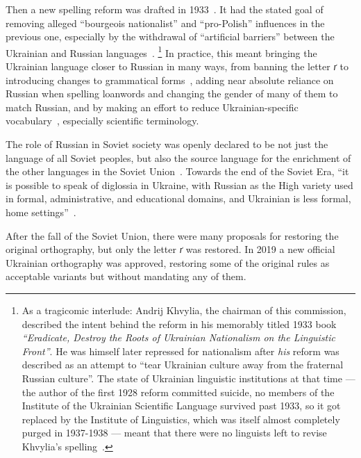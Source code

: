 Then a new \textquotesingle spelling\textquotesingle{} reform was drafted
in 1933~\cite{5c48fce9-c05d-3d4e-94c1-cd6079bff660}. It had the stated goal of
removing alleged ``bourgeois nationalist'' and ``pro-Polish'' influences in
the previous one, especially by the withdrawal of ``artificial barriers''
between the Ukrainian and Russian languages~\cite{karunyk2017ukrainian}.%
\footnote{As a tragicomic interlude: Andrij Khvylia, the chairman of this commission, described the intent behind the reform in his memorably titled 1933 book 
\textit{\enquote{Eradicate, Destroy the Roots of Ukrainian Nationalism on the Linguistic Front}}.   
He was himself later repressed for nationalism after \textit{his} reform was described as an attempt to ``tear Ukrainian culture away from the fraternal Russian culture''. 
The state of Ukrainian linguistic institutions at that time — the author of the first 1928 reform committed suicide, no members of the Institute of the Ukrainian Scientific Language survived past 1933, so it got replaced by the Institute of Linguistics, which was itself almost completely purged in 1937-1938 
— meant that there were no linguists left to revise Khvylia's spelling~\cite{5c48fce9-c05d-3d4e-94c1-cd6079bff660}.
}
In practice, this meant bringing the Ukrainian language closer to Russian in many
ways, from banning the 
letter \emph{ґ} to
introducing changes to grammatical forms~\cite{karunyk2017ukrainian},
adding near absolute reliance on Russian when spelling loanwords and
changing the gender of many of them to match Russian, and by making an
effort to reduce Ukrainian-specific
vocabulary~\cite{5c48fce9-c05d-3d4e-94c1-cd6079bff660}, especially
scientific terminology.

The role of Russian in Soviet society was openly declared to be not just
the language of all Soviet peoples, but also the source language for the
enrichment of the other languages in the Soviet
Union~\cite{press2015ukrainian}.
Towards the end of the Soviet Era, ``it is possible to speak of diglossia
in Ukraine, with Russian as the High variety used in formal,
administrative, and educational domains, and Ukrainian is less formal,
home settings''~\cite{grenoble2010contact}.

After the fall of the Soviet Union, there were many proposals for
restoring the original orthography, but only the letter \emph{ґ} was
restored. In 2019 a new official Ukrainian orthography was
approved, restoring some of the original rules as
acceptable variants but without mandating any of them.

